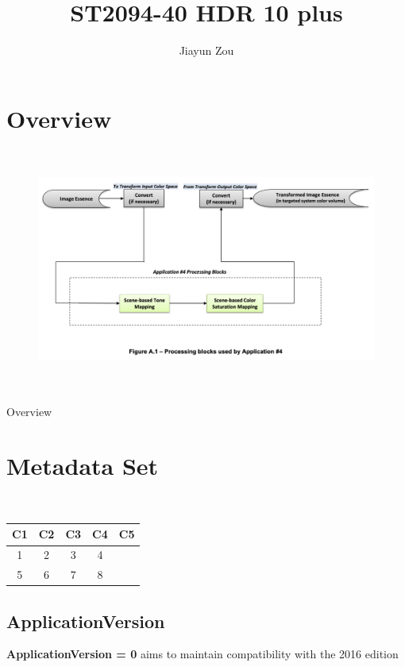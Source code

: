\documentclass{article}
\title{ST2094-40 HDR 10 plus}
\author{Jiayun Zou}
\date{}
\begin{document}
\maketitle
\thispagestyle{empty}
\newpage

\tableofcontents
\thispagestyle{empty}
\newpage

\setlength{\parindent}{2em}

\section{Overview}
\begin{figure}[h]
    \centering
    \includegraphics[width=12cm,height=8cm]{Figure1.png}
\end{figure}
Overview \cite{DMfCVTA4}


\section{Metadata Set}\
\begin{table}[h]
    \centering
    \begin{tabular}{*{5}{c}}
        \toprule
        C1 & C2 & C3 & C4 & C5 \\
        \midrule
        1 & 2 & 3 & 4 \\
        5 & 6 & 7 & 8 \\
        \bottomrule
    \end{tabular}
\end{table}

\subsection{ApplicationVersion}
\noindent \textbf{ApplicationVersion = 0} aims to maintain compatibility with the 2016 edition
\end{document}
